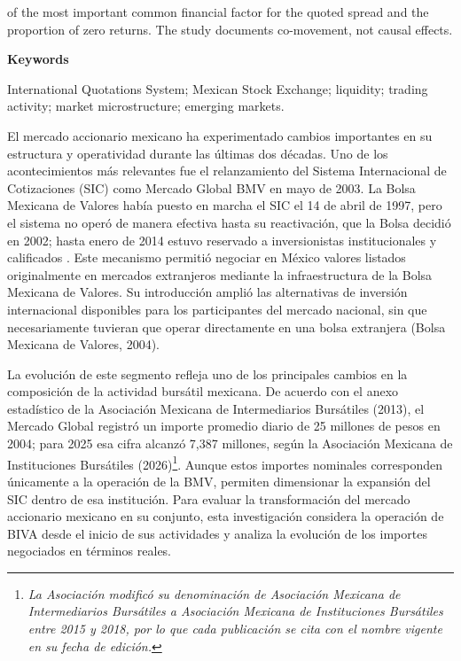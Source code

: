 of the most important common financial factor for the quoted spread and the proportion of zero returns. The study documents co-movement, not causal effects.

\textbf{Keywords}

International Quotations System; Mexican Stock Exchange; liquidity; trading activity; market microstructure; emerging markets.



El mercado accionario mexicano ha experimentado cambios importantes en su estructura y operatividad durante las últimas dos décadas. Uno de los acontecimientos más relevantes fue el relanzamiento del Sistema Internacional de Cotizaciones (SIC) como Mercado Global BMV en mayo de 2003. La Bolsa Mexicana de Valores había puesto en marcha el SIC el 14 de abril de 1997, pero el sistema no operó de manera efectiva hasta su reactivación, que la Bolsa decidió en 2002; hasta enero de 2014 estuvo reservado a inversionistas institucionales y calificados . Este mecanismo permitió negociar en México valores listados originalmente en mercados extranjeros mediante la infraestructura de la Bolsa Mexicana de Valores. Su introducción amplió las alternativas de inversión internacional disponibles para los participantes del mercado nacional, sin que necesariamente tuvieran que operar directamente en una bolsa extranjera (Bolsa Mexicana de Valores, 2004).

La evolución de este segmento refleja uno de los principales cambios en la composición de la actividad bursátil mexicana. De acuerdo con el anexo estadístico de la Asociación Mexicana de Intermediarios Bursátiles (2013), el Mercado Global registró un importe promedio diario de 25 millones de pesos en 2004; para 2025 esa cifra alcanzó 7,387 millones, según la Asociación Mexicana de Instituciones Bursátiles (2026)\footnote{\emph{La Asociación modificó su denominación de Asociación Mexicana de Intermediarios Bursátiles a Asociación Mexicana de Instituciones Bursátiles entre 2015 y 2018, por lo que cada publicación se cita con el nombre vigente en su fecha de edición.}}. Aunque estos importes nominales corresponden únicamente a la operación de la BMV, permiten dimensionar la expansión del SIC dentro de esa institución. Para evaluar la transformación del mercado accionario mexicano en su conjunto, esta investigación considera la operación de BIVA desde el inicio de sus actividades y analiza la evolución de los importes negociados en términos reales.

